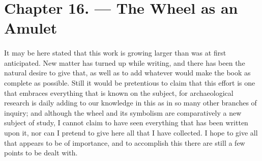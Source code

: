 \documentclass[a4paper, 11pt, oneside, polutonikogreek, english]{article}
\begin{document}
\section{Chapter 16. --- The Wheel as an Amulet}
\paragraph{}
It may be here stated that this work is growing larger than was at first anticipated. New matter has turned up while writing, and there has been the natural desire to give that, as well as to add whatever would make the book as complete as possible. Still it would be pretentious to claim that this effort is one that embraces everything that is known on the subject, for archaeological research is daily adding to our knowledge in this as in so many other branches of inquiry; and although the wheel and its symbolism are comparatively a new subject of study, I cannot claim to have seen everything that has been written upon it, nor can I pretend to give here all that I have collected. I hope to give all that appears to be of importance, and to accomplish this there are still a few points to be dealt with.
\end{document}
